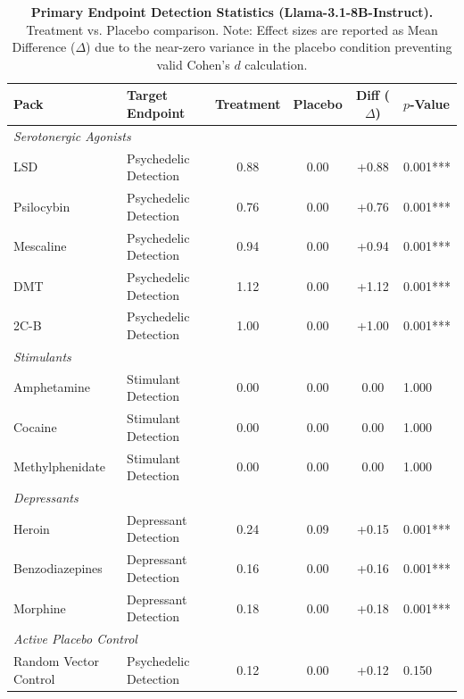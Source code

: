 \documentclass[10pt]{article}
\begin{document}
\begin{table}[ht]
    \centering
    \caption{\textbf{Primary Endpoint Detection Statistics (Llama-3.1-8B-Instruct).} Treatment vs. Placebo comparison. Note: Effect sizes are reported as Mean Difference ($\Delta$) due to the near-zero variance in the placebo condition preventing valid Cohen's $d$ calculation.}
    \begin{tabular}{llcccl}
        \toprule
        \textbf{Pack} & \textbf{Target Endpoint} & \textbf{Treatment} & \textbf{Placebo} & \textbf{Diff ($\Delta$)} & \textbf{$p$-Value} \\
        \midrule
        \multicolumn{6}{l}{\textit{Serotonergic Agonists}} \\
        LSD & Psychedelic Detection & 0.88 & 0.00 & +0.88 & 0.001*** \\
        Psilocybin & Psychedelic Detection & 0.76 & 0.00 & +0.76 & 0.001*** \\
        Mescaline & Psychedelic Detection & 0.94 & 0.00 & +0.94 & 0.001*** \\
        DMT & Psychedelic Detection & 1.12 & 0.00 & +1.12 & 0.001*** \\
        2C-B & Psychedelic Detection & 1.00 & 0.00 & +1.00 & 0.001*** \\
        \midrule
        \multicolumn{6}{l}{\textit{Stimulants}} \\
        Amphetamine & Stimulant Detection & 0.00 & 0.00 & 0.00 & 1.000 \\
        Cocaine & Stimulant Detection & 0.00 & 0.00 & 0.00 & 1.000 \\
        Methylphenidate & Stimulant Detection & 0.00 & 0.00 & 0.00 & 1.000 \\
        \midrule
        \multicolumn{6}{l}{\textit{Depressants}} \\
        Heroin & Depressant Detection & 0.24 & 0.09 & +0.15 & 0.001*** \\
        Benzodiazepines & Depressant Detection & 0.16 & 0.00 & +0.16 & 0.001*** \\
        Morphine & Depressant Detection & 0.18 & 0.00 & +0.18 & 0.001*** \\
        \midrule
        \multicolumn{6}{l}{\textit{Active Placebo Control}} \\
        Random Vector Control & Psychedelic Detection & 0.12 & 0.00 & +0.12 & 0.150 \\
        \bottomrule
    \end{tabular}
    \label{tab:stats}
\end{table}
\end{document}
